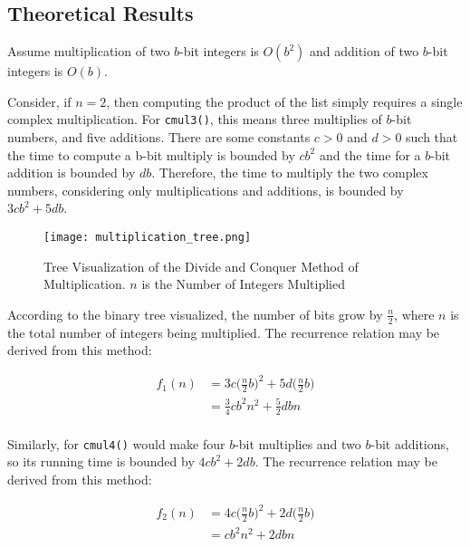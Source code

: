 \documentclass[usletter, 12pt]{article}
\begin{document}
        \subsection{Theoretical Results}
        Assume multiplication of two $b$-bit integers is $O(b^{2})$ and addition of two $b$-bit integers is $O(b)$.

        Consider, if $n = 2$, then computing the product of the list simply requires a single complex multiplication. For \texttt{cmul3()}, this means three multiplies of $b$-bit numbers, and five additions. There are some constants $c>0$ and $d>0$ such that the time to compute a b-bit multiply is bounded by $cb^2$ and the time for a $b$-bit addition is bounded by $db$.  Therefore, the time to multiply the two complex numbers, considering only multiplications and additions, is bounded by $3cb^2+5db$.

        \begin{figure}[ht]
            \begin{center}
                \texttt{[image: multiplication\_tree.png]}
                \caption{Tree Visualization of the Divide and Conquer Method of Multiplication. $n$ is the Number of Integers Multiplied} \label{multiplication_tree}
            \end{center}
        \end{figure}

        According to the binary tree visualized, the number of bits grow by $\frac{n}{2}$, where $n$ is the total number of integers being multiplied. The recurrence relation may be derived from this method:

        \begin{equation*}
            \begin{split}
                f_1(n) & = 3c \Bigg( \frac{n}{2}b \Bigg)^2 + 5d \Bigg(\frac{n}{2}b \Bigg) \\
                & = \frac{3}{4}cb^2n^2+\frac{5}{2}dbn \\
            \end{split}
        \end{equation*}

        Similarly, for \texttt{cmul4()} would make four $b$-bit multiplies and two $b$-bit additions, so its running time is bounded by $4cb^2+2db$. The recurrence relation may be derived from this method:

        \begin{equation*}
            \begin{split}
                f_2(n) & = 4c \Bigg( \frac{n}{2}b \Bigg)^2 + 2d \Bigg(\frac{n}{2}b \Bigg) \\
                & = cb^2n^2+2dbn \\
            \end{split}
        \end{equation*}
\end{document}
